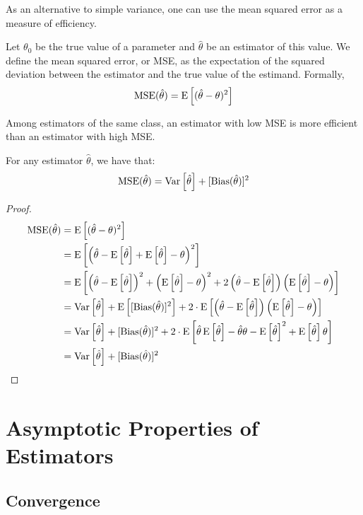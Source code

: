 As an alternative to simple variance, one can use the mean squared error as a measure of efficiency.

\begin{definition} 
Let $\theta_0$ be the true value of a parameter and $\hat\theta$ be an estimator of this value. We define the mean squared error, or MSE, as the expectation of the squared deviation between the estimator and the true value of the estimand. Formally, $$ \operatorname{MSE}(\hat{\theta}) = \operatorname{E}\left[(\hat{\theta} - \theta)^2\right] $$

Among estimators of the same class, an estimator with low MSE is more efficient than an estimator with high MSE.
\end{definition}

\begin{proposition}
For any estimator $\hat\theta$, we have that: $$\operatorname{MSE}(\hat\theta) = \operatorname{Var}\left[\hat\theta\right] + [\operatorname{Bias}(\hat\theta)]^2 $$
\end{proposition}

\begin{proof}
\begin{align*}
\operatorname{MSE}(\hat{\theta}) & = \operatorname{E}\left[(\hat{\theta} - \theta)^2\right] \\ & = \operatorname{E}\left[\left(\hat{\theta} - \operatorname{E}\left[\hat{\theta}\right] + \operatorname{E}\left[\hat{\theta}\right] - \theta\right)^2\right] \\ 
& = \operatorname{E}\left[\left(\hat{\theta} - \operatorname{E}\left[\hat{\theta}\right]\right)^2 + \left(\operatorname{E}\left[\hat{\theta}\right] - \theta\right)^2 + 2\left(\hat{\theta} - \operatorname{E}\left[\hat{\theta}\right]\right)\left(\operatorname{E}\left[\hat{\theta}\right] - \theta\right)\right] \\
& = \operatorname{Var}\left[\hat\theta\right] + \operatorname{E}\left[[\operatorname{Bias}(\hat\theta)]^2\right] + 2\cdot \operatorname{E}\left[\left(\hat{\theta} - \operatorname{E}\left[\hat{\theta}\right]\right)\left(\operatorname{E}\left[\hat{\theta}\right] - \theta\right)\right] \\
& = \operatorname{Var}\left[\hat\theta\right] + [\operatorname{Bias}(\hat\theta)]^2 + 2\cdot \operatorname{E}\left[\hat{\theta}\operatorname{E}\left[\hat{\theta}\right] - \hat{\theta}\theta - \operatorname{E}\left[\hat{\theta}\right]^2 +\operatorname{E}\left[\hat{\theta}\right]\theta\right] \\
& = \operatorname{Var}\left[\hat\theta\right] + [\operatorname{Bias}(\hat\theta)]^2
\end{align*}
\end{proof}

\section{Asymptotic Properties of Estimators}

\subsection{Convergence}

